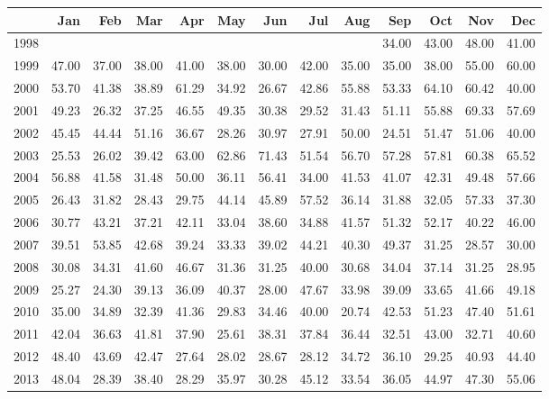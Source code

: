 \begin{longtable}{rrrrrrrrrrrrr}
  \hline
 & Jan & Feb & Mar & Apr & May & Jun & Jul & Aug & Sep & Oct & Nov & Dec \\ 
  \hline
1998 &  &  &  &  &  &  &  &  & 34.00 & 43.00 & 48.00 & 41.00 \\ 
  1999 & 47.00 & 37.00 & 38.00 & 41.00 & 38.00 & 30.00 & 42.00 & 35.00 & 35.00 & 38.00 & 55.00 & 60.00 \\ 
  2000 & 53.70 & 41.38 & 38.89 & 61.29 & 34.92 & 26.67 & 42.86 & 55.88 & 53.33 & 64.10 & 60.42 & 40.00 \\ 
  2001 & 49.23 & 26.32 & 37.25 & 46.55 & 49.35 & 30.38 & 29.52 & 31.43 & 51.11 & 55.88 & 69.33 & 57.69 \\ 
  2002 & 45.45 & 44.44 & 51.16 & 36.67 & 28.26 & 30.97 & 27.91 & 50.00 & 24.51 & 51.47 & 51.06 & 40.00 \\ 
  2003 & 25.53 & 26.02 & 39.42 & 63.00 & 62.86 & 71.43 & 51.54 & 56.70 & 57.28 & 57.81 & 60.38 & 65.52 \\ 
  2004 & 56.88 & 41.58 & 31.48 & 50.00 & 36.11 & 56.41 & 34.00 & 41.53 & 41.07 & 42.31 & 49.48 & 57.66 \\ 
  2005 & 26.43 & 31.82 & 28.43 & 29.75 & 44.14 & 45.89 & 57.52 & 36.14 & 31.88 & 32.05 & 57.33 & 37.30 \\ 
  2006 & 30.77 & 43.21 & 37.21 & 42.11 & 33.04 & 38.60 & 34.88 & 41.57 & 51.32 & 52.17 & 40.22 & 46.00 \\ 
  2007 & 39.51 & 53.85 & 42.68 & 39.24 & 33.33 & 39.02 & 44.21 & 40.30 & 49.37 & 31.25 & 28.57 & 30.00 \\ 
  2008 & 30.08 & 34.31 & 41.60 & 46.67 & 31.36 & 31.25 & 40.00 & 30.68 & 34.04 & 37.14 & 31.25 & 28.95 \\ 
  2009 & 25.27 & 24.30 & 39.13 & 36.09 & 40.37 & 28.00 & 47.67 & 33.98 & 39.09 & 33.65 & 41.66 & 49.18 \\ 
  2010 & 35.00 & 34.89 & 32.39 & 41.36 & 29.83 & 34.46 & 40.00 & 20.74 & 42.53 & 51.23 & 47.40 & 51.61 \\ 
  2011 & 42.04 & 36.63 & 41.81 & 37.90 & 25.61 & 38.31 & 37.84 & 36.44 & 32.51 & 43.00 & 32.71 & 40.60 \\ 
  2012 & 48.40 & 43.69 & 42.47 & 27.64 & 28.02 & 28.67 & 28.12 & 34.72 & 36.10 & 29.25 & 40.93 & 44.40 \\ 
  2013 & 48.04 & 28.39 & 38.40 & 28.29 & 35.97 & 30.28 & 45.12 & 33.54 & 36.05 & 44.97 & 47.30 & 55.06 \\ 

\end{longtable}

